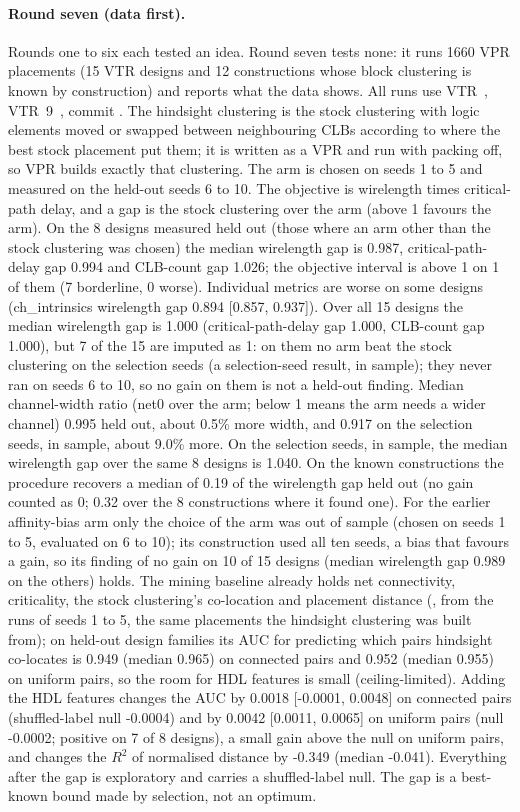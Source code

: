 \paragraph{Round seven (data first).} Rounds one to six each tested an idea. Round seven tests none: it runs 1660 VPR placements (15 VTR designs and 12 constructions whose block clustering is known by construction) and reports what the data shows. All runs use VTR~\cite{rose2012vtr}, VTR~9~\cite{elgammal2025vtr9}, commit . The hindsight clustering is the stock clustering with logic elements moved or swapped between neighbouring CLBs according to where the best stock placement put them; it is written as a VPR  and run with packing off, so VPR builds exactly that clustering. The arm is chosen on seeds 1 to 5 and measured on the held-out seeds 6 to 10. The objective is wirelength times critical-path delay, and a gap is the stock clustering over the arm (above 1 favours the arm). On the 8 designs measured held out (those where an arm other than the stock clustering was chosen) the median wirelength gap is 0.987, critical-path-delay gap 0.994 and CLB-count gap 1.026; the objective interval is above 1 on 1 of them (7 borderline, 0 worse). Individual metrics are worse on some designs (ch\_intrinsics wirelength gap 0.894 [0.857, 0.937]). Over all 15 designs the median wirelength gap is 1.000 (critical-path-delay gap 1.000, CLB-count gap 1.000), but 7 of the 15 are imputed as 1: on them no arm beat the stock clustering on the selection seeds (a selection-seed result, in sample); they never ran on seeds 6 to 10, so no gain on them is not a held-out finding. Median channel-width ratio (net0 over the arm; below 1 means the arm needs a wider channel) 0.995 held out, about 0.5\% more width, and 0.917 on the selection seeds, in sample, about 9.0\% more. On the selection seeds, in sample, the median wirelength gap over the same 8 designs is 1.040. On the known constructions the procedure recovers a median of 0.19 of the wirelength gap held out (no gain counted as 0; 0.32 over the 8 constructions where it found one). For the earlier affinity-bias arm only the choice of the arm was out of sample (chosen on seeds 1 to 5, evaluated on 6 to 10); its construction used all ten seeds, a bias that favours a gain, so its finding of no gain on 10 of 15 designs (median wirelength gap 0.989 on the others) holds. The mining baseline already holds net connectivity, criticality, the stock clustering's co-location and placement distance (, from the  runs of seeds 1 to 5, the same placements the hindsight clustering was built from); on held-out design families its AUC for predicting which pairs hindsight co-locates is 0.949 (median 0.965) on connected pairs and 0.952 (median 0.955) on uniform pairs, so the room for HDL features is small (ceiling-limited). Adding the HDL features changes the AUC by 0.0018 [-0.0001, 0.0048] on connected pairs (shuffled-label null -0.0004) and by 0.0042 [0.0011, 0.0065] on uniform pairs (null -0.0002; positive on 7 of 8 designs), a small gain above the null on uniform pairs, and changes the $R^2$ of normalised distance by -0.349 (median -0.041). Everything after the gap is exploratory and carries a shuffled-label null. The gap is a best-known bound made by selection, not an optimum.
